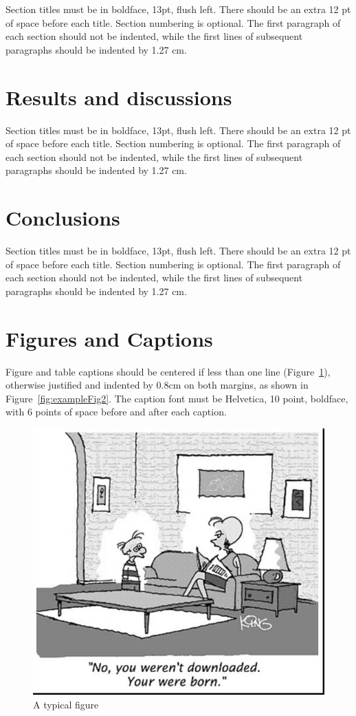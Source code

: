 \documentclass[12pt]{article}
\begin{document}
Section titles must be in boldface, 13pt, flush left. There should be an extra
12 pt of space before each title. Section numbering is optional. The first
paragraph of each section should not be indented, while the first lines of
subsequent paragraphs should be indented by 1.27 cm.

\section{Results and discussions}

Section titles must be in boldface, 13pt, flush left. There should be an extra
12 pt of space before each title. Section numbering is optional. The first
paragraph of each section should not be indented, while the first lines of
subsequent paragraphs should be indented by 1.27 cm.

\section{Conclusions}

Section titles must be in boldface, 13pt, flush left. There should be an extra
12 pt of space before each title. Section numbering is optional. The first
paragraph of each section should not be indented, while the first lines of
subsequent paragraphs should be indented by 1.27 cm.

\section{Figures and Captions}\label{sec:figs}


Figure and table captions should be centered if less than one line
(Figure~\ref{fig:exampleFig1}), otherwise justified and indented by 0.8cm on
both margins, as shown in Figure~\ref{fig:exampleFig2}. The caption font must
be Helvetica, 10 point, boldface, with 6 points of space before and after each
caption.

\begin{figure}[ht]
\centering
\includegraphics[width=.5\textwidth]{fig1.jpg}
\caption{A typical figure}
\label{fig:exampleFig1}
\end{figure}
\end{document}
